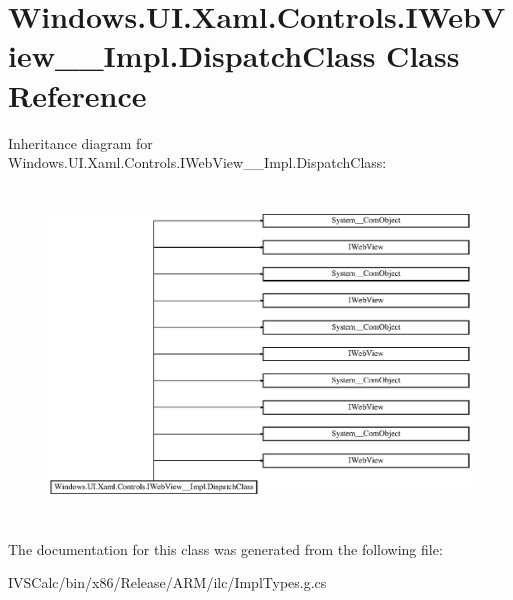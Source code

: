 \hypertarget{class_windows_1_1_u_i_1_1_xaml_1_1_controls_1_1_i_web_view_____impl_1_1_dispatch_class}{}\section{Windows.\+U\+I.\+Xaml.\+Controls.\+I\+Web\+View\+\_\+\+\_\+\+Impl.\+Dispatch\+Class Class Reference}
\label{class_windows_1_1_u_i_1_1_xaml_1_1_controls_1_1_i_web_view_____impl_1_1_dispatch_class}
Inheritance diagram for Windows.\+U\+I.\+Xaml.\+Controls.\+I\+Web\+View\+\_\+\+\_\+\+Impl.\+Dispatch\+Class\+:\begin{figure}[H]
\begin{center}
\leavevmode
\includegraphics[height=8.850575cm]{class_windows_1_1_u_i_1_1_xaml_1_1_controls_1_1_i_web_view_____impl_1_1_dispatch_class}
\end{center}
\end{figure}


The documentation for this class was generated from the following file\+:\begin{DoxyCompactItemize}
\item 
I\+V\+S\+Calc/bin/x86/\+Release/\+A\+R\+M/ilc/Impl\+Types.\+g.\+cs\end{DoxyCompactItemize}
